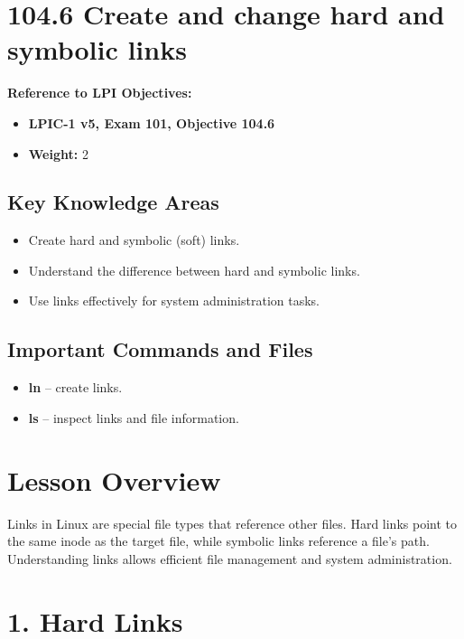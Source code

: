 \documentclass[a4paper]{report}
\begin{document}
\section*{104.6 Create and change hard and symbolic links}

\textbf{Reference to LPI Objectives:}
\begin{itemize}
    \item \textbf{LPIC-1 v5, Exam 101, Objective 104.6}
    \item \textbf{Weight:} 2
\end{itemize}

\subsection*{Key Knowledge Areas}
\begin{itemize}
    \item Create hard and symbolic (soft) links.
    \item Understand the difference between hard and symbolic links.
    \item Use links effectively for system administration tasks.
\end{itemize}

\subsection*{Important Commands and Files}
\begin{itemize}
    \item \textbf{ln} -- create links.
    \item \textbf{ls} -- inspect links and file information.
\end{itemize}

\section*{Lesson Overview}

Links in Linux are special file types that reference other files. Hard links point to the same inode as the target file, while symbolic links reference a file's path. Understanding links allows efficient file management and system administration.

\section*{1. Hard Links}
\end{document}
